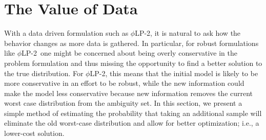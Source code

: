 \documentclass[11pt]{article}
\renewcommand{\P}{\mathbb{P}}
\newcommand{\p}[1]{\P \left[ #1 \right]}
\newcommand{\plp}{$\phi$LP-2}
\begin{document}

\section{The Value of Data} \label{sec:value}

With a data driven formulation such as \plp, it is natural to ask how the behavior changes as more data is gathered.
In particular, for robust formulations like \plp\ one might be concerned about being overly conservative in the problem formulation and thus missing the opportunity to find a better solution to the true distribution.
For \plp, this means that the initial model is likely to be more conservative in an effort to be robust, while the new information could make the model less conservative because new information removes the current worst case distribution from the ambiguity set.  
In this section, we present a simple method of estimating the probability that taking an additional sample will eliminate the old worst-case distribution and allow for better optimization; i.e., a lower-cost solution.
\end{document}
